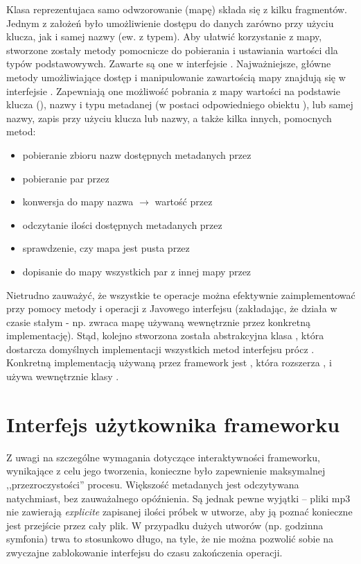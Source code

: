 Klasa reprezentujaca samo odwzorowanie (mapę) składa się z kilku fragmentów. Jednym z założeń było
umożliwienie dostępu do danych zarówno przy użyciu klucza, jak i samej nazwy (ew. z typem). Aby
ułatwić korzystanie z mapy, stworzone zostały metody pomocnicze do pobierania i ustawiania wartości
dla typów podstawowywch. Zawarte są one w interfejsie . Najważniejsze, główne
metody umożliwiające dostęp i manipulowanie zawartością mapy znajdują się w interfejsie
. Zapewniają one możliwość pobrania z mapy wartości na podstawie klucza
(), nazwy i typu metadanej (w postaci odpowiedniego obiektu ), lub samej
nazwy, zapis przy użyciu klucza lub nazwy, a także kilka innych, pomocnych metod:

\begin{itemize}
  \item pobieranie zbioru nazw dostępnych metadanych przez 
  \item pobieranie par  przez  
  \item konwersja do mapy nazwa $\to$ wartość przez 
  \item odczytanie ilości dostępnych metadanych przez 
  \item sprawdzenie, czy mapa jest pusta przez 
  \item dopisanie do mapy wszystkich par z innej mapy przez 
\end{itemize}

Nietrudno zauważyć, że wszystkie te operacje można efektywnie zaimplementować przy pomocy metody
 i operacji z Javowego interfejsu  (zakładając, że  działa w
czasie stałym - np. zwraca mapę używaną wewnętrznie przez konkretną implementację). Stąd, kolejno
stworzona została abstrakcyjna klasa , która dostarcza domyślnych
implementacji wszystkich metod interfejsu  prócz . Konkretną
implementacją używaną przez framework jest , która rozszerza
, i używa wewnętrznie klasy .


\section{Interfejs użytkownika frameworku}

Z uwagi na szczególne wymagania dotyczące interaktywności frameworku, wynikające z celu jego
tworzenia, konieczne było zapewnienie maksymalnej ,,przezroczystości'' procesu.  Większość
metadanych jest odczytywana natychmiast, bez zauważalnego opóźnienia. Są jednak pewne wyjątki --
pliki mp3 nie zawierają \textit{explicite} zapisanej ilości próbek w utworze, aby ją poznać
konieczne jest przejście przez cały plik. W przypadku dużych utworów (np. godzinna symfonia) trwa to
stosunkowo długo, na tyle, że nie można pozwolić sobie na zwyczajne zablokowanie interfejsu do czasu
zakończenia operacji.

